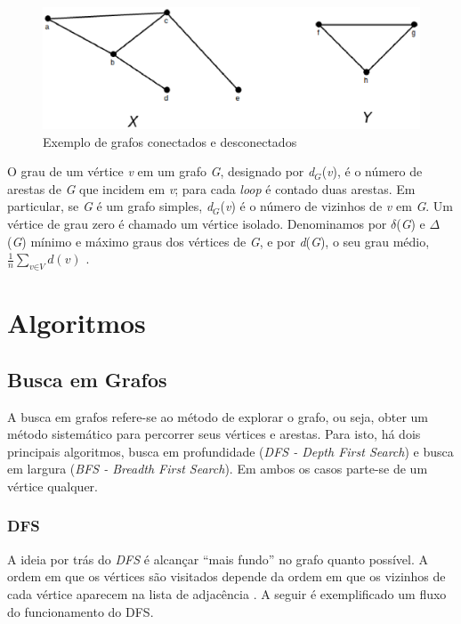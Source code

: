 \begin{apendicesenv}
\begin{figure}[!h]
	\centering
	\includegraphics[scale=0.45]{figuras/referencial_teorico/desconectados.eps}
	\caption[Exemplo de grafos conectados e desconectados]{Exemplo de grafos conectados e desconectados \cite{Bondy:2007}}
	\label{desconectados}
\end{figure}

O grau de um vértice \textit{v} em um grafo \textit{G}, designado por \textit{d$_G$}(\textit{v}), é o número de arestas de \textit{G} que incidem em \textit{v}; para cada \textit{loop} é contado duas arestas. Em particular, se \textit{G} é um grafo simples, \textit{d$_G$}(\textit{v}) é o número de vizinhos de \textit{v} em \textit{G}. Um vértice de grau zero é chamado um vértice isolado. Denominamos por $\delta$(\textit{G}) e $\Delta$(\textit{G}) mínimo e máximo graus dos vértices de \textit{G}, e por \textit{d}(\textit{G}), o seu grau médio, $\frac{1}{n}\sum_{\textit{v}\in\textit{V}} \textit{d}(\textit{v})$ \cite{Diestel:1997}.

\chapter{Algoritmos}

\section{Busca em Grafos}

A busca em grafos refere-se ao método de explorar o grafo, ou seja, obter um método sistemático para percorrer seus vértices e arestas. Para isto, há dois principais algoritmos, busca em profundidade (\textit{DFS - Depth First Search}) e busca em largura (\textit{BFS - Breadth First Search}). Em ambos os casos parte-se de um vértice qualquer.

\subsection{DFS}
\label{subsec:dfs}

A ideia por trás do \textit{DFS} é alcançar ``mais fundo'' no grafo quanto possível. A ordem em que os vértices são visitados depende da ordem em que os vizinhos de cada vértice aparecem na lista de adjacência \cite{Cormen:2001}. A seguir é exemplificado um fluxo do funcionamento do DFS.


\end{apendicesenv}
